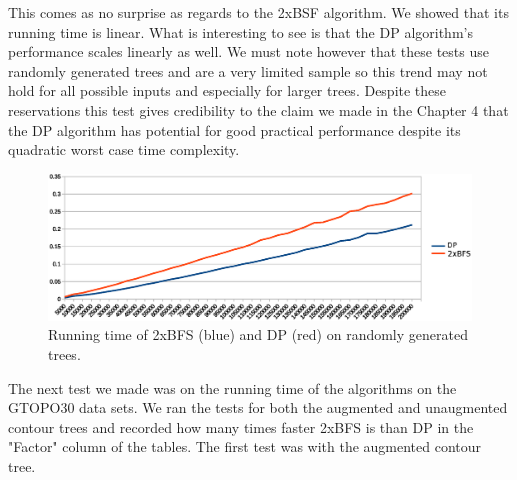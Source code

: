 This comes as no surprise as regards to the 2xBSF algorithm. We showed that its running time is linear. What is interesting to see is that the DP algorithm's performance scales linearly as well. We must note however that these tests use randomly generated trees and are a very limited sample so this trend may not hold for all possible inputs and especially for larger trees. Despite these reservations this test gives credibility to the claim we made in the Chapter 4 that the DP algorithm has potential for good practical performance despite its quadratic worst case time complexity.

\begin{figure}[h]%
    \centering
    \includegraphics[center, scale=0.6 ]{./images/empirical/chart-cp-2bfs.eps}
    \caption{Running time of 2xBFS (blue) and DP (red) on randomly generated trees. }%
    \label{fig:2xbfs-dp}%
\end{figure}



The next test we made was on the running time of the algorithms on the GTOPO30 data sets. We ran the tests for both the augmented and unaugmented contour trees and recorded how many times faster 2xBFS is than DP in the "Factor" column of the tables. The first test was with the augmented contour tree.

